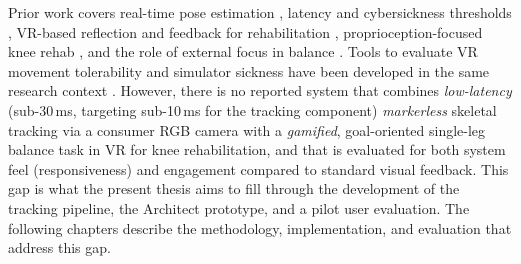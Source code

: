 Prior work covers real-time pose estimation \cite{Jiang.2023, Lugaresi.2019}, latency and cybersickness thresholds \cite{caserman2019latency, waltemate2016impact}, VR-based reflection and feedback for rehabilitation \cite{kim2020vrrt, klausing2025feasibility}, proprioception-focused knee rehab \cite{jogi2024proprioception}, and the role of external focus in balance \cite{sherman2021external}. Tools to evaluate VR movement tolerability and simulator sickness have been developed in the same research context \cite{Hollaus.2024}. However, there is no reported system that combines \emph{low-latency} (sub-30\,ms, targeting sub-10\,ms for the tracking component) \emph{markerless} skeletal tracking via a consumer RGB camera with a \emph{gamified}, goal-oriented single-leg balance task in VR for knee rehabilitation, and that is evaluated for both system feel (responsiveness) and engagement compared to standard visual feedback. This gap is what the present thesis aims to fill through the development of the tracking pipeline, the Architect prototype, and a pilot user evaluation. The following chapters describe the methodology, implementation, and evaluation that address this gap.
